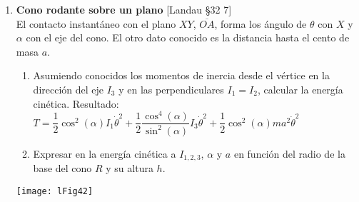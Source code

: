 \documentclass[11pt, spanish, a4paper, twoside]{article}
\begin{document}
\begin{enumerate}
	\item 
		\begin{minipage}[t][3.5cm]{0.53\textwidth}
			\textbf{Cono rodante sobre un plano} [Landau \S 32 7]\\
				 El contacto instantáneo con el plano \(X Y\), \(\overline{O A}\), forma los ángulo de \(\theta\) con \(X\) y \(\alpha\) con el eje del cono.
				 El otro dato conocido es la distancia hasta el cento de masa \(a\).
				\begin{enumerate}
					\item Asumiendo conocidos los momentos de inercia desde el vértice en la dirección del eje \(I_3\) y en las perpendiculares \(I_1 = I_2\), calcular la energía cinética.
					Resultado:\\
					\(T = \dfrac{1}{2} \cos^2(\alpha) I_1 \dot{\theta}^{2} + \dfrac{1}{2} \dfrac{\cos^4(\alpha)}{\sin^2(\alpha)} I_3  \dot{\theta}^{2} + \dfrac{1}{2} \cos^2(\alpha) m a^{2} \dot{\theta}^{2} \)
					\item Expresar en la energía cinética a \(I_{1,2,3}\), \(\alpha\) y \(a\) en función del radio de la base del cono \(R\) y su altura \(h\).
				\end{enumerate}
		\end{minipage}
		\begin{minipage}[c][0cm][t]{0.4\textwidth}
			\texttt{[image: lFig42]}
		\end{minipage}

\end{enumerate}
\end{document}
